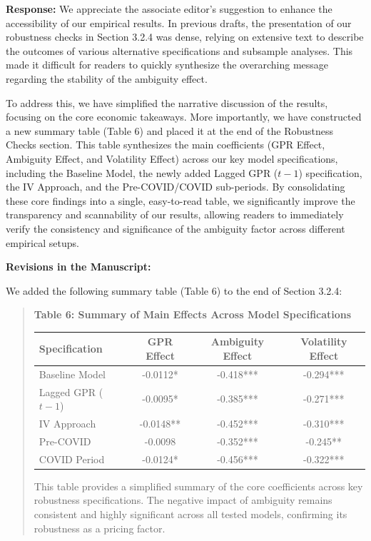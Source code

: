 \documentclass[12pt]{article}
\begin{document}
\begin{highlightbox}
\textbf{Response:} We appreciate the associate editor's suggestion to enhance the accessibility of our empirical results. In previous drafts, the presentation of our robustness checks in Section 3.2.4 was dense, relying on extensive text to describe the outcomes of various alternative specifications and subsample analyses. This made it difficult for readers to quickly synthesize the overarching message regarding the stability of the ambiguity effect.

To address this, we have simplified the narrative discussion of the results, focusing on the core economic takeaways. More importantly, we have constructed a new summary table (Table 6) and placed it at the end of the Robustness Checks section. This table synthesizes the main coefficients (GPR Effect, Ambiguity Effect, and Volatility Effect) across our key model specifications, including the Baseline Model, the newly added Lagged GPR ($t-1$) specification, the IV Approach, and the Pre-COVID/COVID sub-periods. By consolidating these core findings into a single, easy-to-read table, we significantly improve the transparency and scannability of our results, allowing readers to immediately verify the consistency and significance of the ambiguity factor across different empirical setups.
\end{highlightbox}

\begin{highlightbox}
\textbf{Revisions in the Manuscript:}

We added the following summary table (Table 6) to the end of Section 3.2.4:
\vspace{0.2cm}
\begin{quote}
\color{red}\itshape
\begin{center}
\centering
\textbf{Table 6: Summary of Main Effects Across Model Specifications}
\begin{tabular}{lccc}
\hline
Specification & GPR Effect & Ambiguity Effect & Volatility Effect \\
\hline
Baseline Model & -0.0112* & -0.418*** & -0.294*** \\
Lagged GPR ($t-1$) & -0.0095* & -0.385*** & -0.271*** \\
IV Approach & -0.0148** & -0.452*** & -0.310*** \\
Pre-COVID & -0.0098 & -0.352*** & -0.245** \\
COVID Period & -0.0124* & -0.456*** & -0.322*** \\
\hline
\end{tabular}
\end{center}
This table provides a simplified summary of the core coefficients across key robustness specifications. The negative impact of ambiguity remains consistent and highly significant across all tested models, confirming its robustness as a pricing factor.

\end{quote}
\end{highlightbox}
\end{document}
